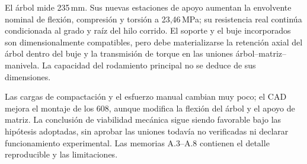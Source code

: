 El árbol mide 235\,mm. Sus nuevas estaciones de apoyo aumentan la envolvente
nominal de flexión, compresión y torsión a 23,46\,MPa;
su resistencia real continúa condicionada al grado y raíz del hilo corrido.
El soporte y el buje incorporados son dimensionalmente compatibles,
pero debe materializarse la retención axial del árbol dentro del buje
y la transmisión de torque en las uniones árbol--matriz--manivela.
La capacidad del rodamiento principal no se deduce de sus dimensiones.

Las cargas de compactación y el esfuerzo manual cambian muy poco; el CAD
mejora el montaje de los 608, aunque modifica la flexión del árbol y el
apoyo de matriz. La conclusión de viabilidad mecánica sigue siendo
favorable bajo las hipótesis adoptadas, sin aprobar las uniones todavía
no verificadas ni declarar funcionamiento experimental. Las memorias
A.3--A.8 contienen el detalle reproducible y las limitaciones.

